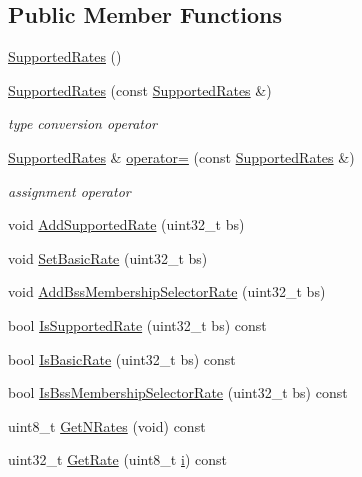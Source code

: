 \subsection*{Public Member Functions}
\begin{DoxyCompactItemize}
\item 
\hyperlink{classns3_1_1SupportedRates_a1cbc260969e9b5db5a06715b102e36ec}{Supported\+Rates} ()
\item 
\hyperlink{classns3_1_1SupportedRates_aa3a771afc406c81fbdd6a288e6acaa92}{Supported\+Rates} (const \hyperlink{classns3_1_1SupportedRates}{Supported\+Rates} \&)
\begin{DoxyCompactList}\small\item\em type conversion operator \end{DoxyCompactList}\item 
\hyperlink{classns3_1_1SupportedRates}{Supported\+Rates} \& \hyperlink{classns3_1_1SupportedRates_a7cdb1fe2d31245e2774efe61d6749cd5}{operator=} (const \hyperlink{classns3_1_1SupportedRates}{Supported\+Rates} \&)
\begin{DoxyCompactList}\small\item\em assignment operator \end{DoxyCompactList}\item 
void \hyperlink{classns3_1_1SupportedRates_a2507a6b7a8ce4dd538f34029d3b17602}{Add\+Supported\+Rate} (uint32\+\_\+t bs)
\item 
void \hyperlink{classns3_1_1SupportedRates_a4178a4b7834b6a66e0c8efe4d92489bf}{Set\+Basic\+Rate} (uint32\+\_\+t bs)
\item 
void \hyperlink{classns3_1_1SupportedRates_a4954ea83ef36e75a2809f4b95984c919}{Add\+Bss\+Membership\+Selector\+Rate} (uint32\+\_\+t bs)
\item 
bool \hyperlink{classns3_1_1SupportedRates_a149fb7d252989f98c901af5c966f9695}{Is\+Supported\+Rate} (uint32\+\_\+t bs) const 
\item 
bool \hyperlink{classns3_1_1SupportedRates_a44640bbed67263ace5689f01948f1732}{Is\+Basic\+Rate} (uint32\+\_\+t bs) const 
\item 
bool \hyperlink{classns3_1_1SupportedRates_a60fabea64f3e9789f33743525c0bac6d}{Is\+Bss\+Membership\+Selector\+Rate} (uint32\+\_\+t bs) const 
\item 
uint8\+\_\+t \hyperlink{classns3_1_1SupportedRates_a230bd1a3eb4497cdde9791dd0ca7d11c}{Get\+N\+Rates} (void) const 
\item 
uint32\+\_\+t \hyperlink{classns3_1_1SupportedRates_aacb750df366327a7b6dc6c70f1dde8e3}{Get\+Rate} (uint8\+\_\+t \hyperlink{lte__uplink__power__control_8m_a6f6ccfcf58b31cb6412107d9d5281426}{i}) const 

\end{DoxyCompactItemize}
